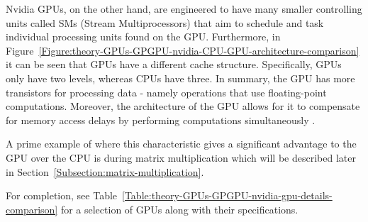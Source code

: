 Nvidia GPUs, on the other hand, are engineered to have many smaller controlling units called SMs (Stream Multiprocessors) that aim to schedule and task individual processing units found on the GPU. Furthermore, in Figure~\ref{Figure:theory-GPUs-GPGPU-nvidia-CPU-GPU-architecture-comparison} it can be seen that GPUs have a different cache structure. Specifically, GPUs only have two levels, whereas CPUs have three. In summary, the GPU has more transistors for processing data - namely operations that use floating-point computations. Moreover, the architecture of the GPU allows for it to compensate for memory access delays by performing computations simultaneously \cite{NVIDIAMay2022}.
\par A prime example of where this characteristic gives a significant advantage to the GPU over the CPU is during matrix multiplication which will be described later in Section~\ref{Subsection:matrix-multiplication}.
\par For completion, see Table~\ref{Table:theory-GPUs-GPGPU-nvidia-gpu-details-comparison} for a selection of GPUs along with their specifications.

